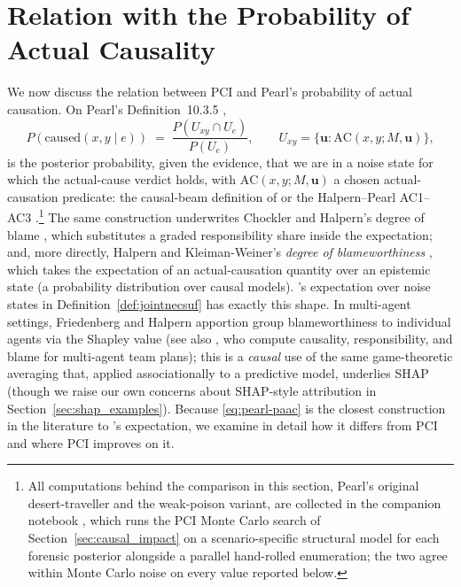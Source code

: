 \section{Relation with the Probability of Actual Causality}
\label{sub:pearl_actual_cause_prob}

We now discuss the relation between PCI and
Pearl's probability of actual causation. On 
Pearl's Definition~10.3.5 \citep[Ch.~10]{causalityPearl},
\begin{equation}\label{eq:pearl-paac}
P(\text{caused}(x,y\mid e)) \;=\; \frac{P(U_{xy}\cap U_e)}{P(U_e)},
\qquad U_{xy}=\{\mathbf{u}\colon \mathrm{AC}(x,y;M,\mathbf{u})\},
\end{equation}
is the posterior probability, given the evidence, that we are in a noise state
for which the actual-cause verdict holds, with $\mathrm{AC}(x,y;M,\mathbf{u})$
a chosen actual-causation predicate: the causal-beam definition of
\citep[Ch.~10]{causalityPearl} or the Halpern--Pearl AC1--AC3
\citep{actualCausalityHalpern}.\footnote{\label{fn:desert_notebook}All
computations behind the comparison in this section, Pearl's original
desert-traveller and the weak-poison variant, are collected in the companion
notebook , which runs the PCI
Monte Carlo search of Section~\ref{sec:causal_impact} on a scenario-specific
structural model for each forensic posterior alongside a parallel hand-rolled
enumeration; the two agree within Monte Carlo noise on every value reported
below.}
The same construction underwrites Chockler and Halpern's degree of blame
\citep{chocklerResponsibilityBlameStructuralModel2004}, which substitutes a
graded responsibility share inside the expectation; and, more directly,
Halpern and Kleiman-Weiner's \emph{degree of blameworthiness}
\citep{halpernKleimanWeinerBlameworthiness2018}, which takes the expectation
of an actual-causation quantity over an epistemic state (a probability
distribution over causal models). \ourapproach{}'s expectation over noise
states in Definition~\ref{def:jointnecsuf} has exactly this shape. In
multi-agent settings, Friedenberg and Halpern
\citep{friedenbergHalpernBlameworthiness2019} apportion group blameworthiness
to individual agents via the Shapley value (see also
\citealp{alechinaTeamPlans2020}, who compute causality, responsibility, and
blame for multi-agent team plans); this is a \emph{causal} use of the
same game-theoretic averaging that, applied associationally to a predictive
model, underlies SHAP (though we raise our own concerns about SHAP-style
attribution in Section~\ref{sec:shap_examples}). Because
\eqref{eq:pearl-paac} is the closest construction in the literature to
\ourapproach{}'s expectation, we examine in detail how it differs from PCI
and where PCI improves on it.

